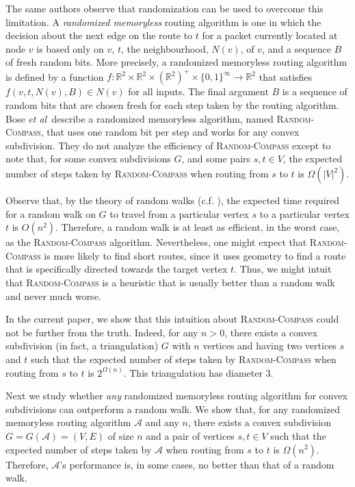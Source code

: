 \documentclass{elsarticle}
\newcommand{\R}{\mathbb{R}}
\newcommand{\etal}{\emph{et al}}
\begin{document}
The same authors \cite{bose02,bose04} observe that randomization can be used to overcome this limitation.  A \emph{randomized memoryless} routing algorithm is one in which the decision about the next edge on the route to $t$ for a packet currently located at node $v$ is based only on $v$, $t$, the neighbourhood, $N(v)$, of $v$, and a sequence $B$ of fresh random bits.  More precisely, a randomized memoryless routing algorithm is defined by a function $f:\R^2\times\R^2\times(\R^2)^+\times\{0,1\}^\infty\rightarrow \R^2$ that satisfies $f(v,t,N(v),B) \in N(v)$ for all inputs.  The final argument $B$ is a sequence of random bits that are chosen fresh for each step taken by the routing algorithm. Bose \etal\ describe a randomized memoryless algorithm, named \textsc{Random-Compass}, that uses one random bit per step and works for any convex subdivision. They do not analyze the efficiency of \textsc{Random-Compass} except to note that, for some convex subdivisions $G$, and some pairs $s,t\in V$, the expected number of steps taken by \textsc{Random-Compass} when routing from $s$ to $t$ is $\Omega(|V|^2)$.  

Observe that, by the theory of random walks (c.f. \cite[Theorem~6.6]{mr95}), the expected time required for a random walk on $G$ to travel from a particular vertex $s$ to a particular vertex $t$ is $O(n^2)$.  Therefore, a random walk is at least as efficient, in the worst case, as the \textsc{Random-Compass} algorithm. Nevertheless, one might expect that \textsc{Random-Compass} is more likely to find short routes, since it uses geometry to find a route that is specifically directed towards the target vertex $t$.  Thus, we might intuit that \textsc{Random-Compass} is a heuristic that is usually better than a random walk and never much worse.

In the current paper, we show that this intuition about \textsc{Random-Compass} could not be further from the truth.  Indeed, for any $n>0$, there exists a convex subdivision (in fact, a triangulation) $G$ with $n$ vertices and having two vertices $s$ and $t$ such that the expected number of steps taken by \textsc{Random-Compass} when routing from $s$ to $t$ is $2^{\Omega(n)}$. This triangulation has diameter 3.

Next we study whether \emph{any} randomized memoryless routing algorithm for convex subdivisions can outperform a random walk.  We show that, for any randomized memoryless routing algorithm $\mathcal{A}$ and any $n$, there exists a convex subdivision $G=G(\mathcal{A})=(V,E)$ of size $n$ and a pair of vertices $s,t\in V$ such that the expected number of steps taken by $\mathcal{A}$ when routing from $s$ to $t$ is $\Omega(n^2)$.  Therefore, $\mathcal{A}$'s performance is, in some cases, no better than that of a random walk.
\end{document}
